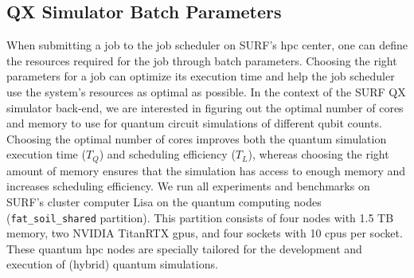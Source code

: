 \subsection{QX Simulator Batch Parameters} \label{sec:qx-parameters}
When submitting a job to the job scheduler on SURF's \gls{hpc} center, one can define the resources required for the job through batch parameters.
Choosing the right parameters for a job can optimize its execution time and help the job scheduler use the system's resources as optimal as possible.
In the context of the SURF QX simulator back-end, we are interested in figuring out the optimal number of cores and memory to use for quantum circuit simulations of different qubit counts.
Choosing the optimal number of cores improves both the quantum simulation execution time ($T_Q$) and scheduling efficiency ($T_L$), whereas choosing the right amount of memory ensures that the simulation has access to enough memory and increases scheduling efficiency.
We run all experiments and benchmarks on SURF's cluster computer Lisa on the quantum computing nodes (\texttt{fat_soil_shared} partition).
This partition consists of four nodes with 1.5 TB memory, two NVIDIA TitanRTX \glspl{gpu}, and four sockets with 10 \glspl{cpu} per socket.
These quantum \gls{hpc} nodes are specially tailored for the development and execution of (hybrid) quantum simulations.

